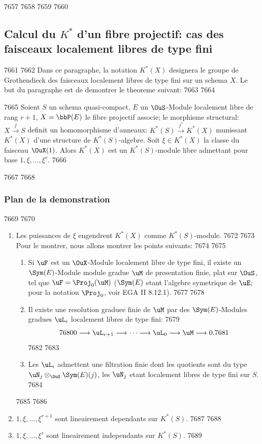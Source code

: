   7657	
  7658	\vspace{1em}
  7659	
  7660	\subsection{Calcul du $K^*$ d'un fibre projectif: cas des faisceaux localement libres de type fini}
  7661	
  7662	Dans ce paragraphe, la notation $K^*(X)$ designera le groupe de Grothendieck des faisceaux localement libres de type fini sur un schema $X$. Le but du paragraphe est de demontrer le theoreme suivant:
  7663	
  7664	\begin{thm}[1.1]\label{thm:1.1}
  7665	Soient $S$ un schema quasi-compact, $E$ un $\OuS$-Module localement libre de rang $r+1$, $X = \bbP(E)$ le fibre projectif associe; le morphisme structural: $X \xrightarrow{f} S$ definit un homomorphisme d'anneaux: $K^*(S) \xrightarrow{f^*} K^*(X)$ munissant $K^*(X)$ d'une structure de $K^*(S)$-algebre. Soit $\xi \in K^*(X)$ la classe du faisceau $\OuX(1)$. Alors $K^*(X)$ est un $K^*(S)$-module libre admettant pour base $1, \xi, \ldots, \xi^r$.
  7666	\end{thm}
  7667	
  7668	\subsubsection{Plan de la demonstration}
  7669	
  7670	\begin{enumerate}[label=$\arabic*^{\circ}$)]
  7671	\item Les puissances de $\xi$ engendrent $K^*(X)$ comme $K^*(S)$-module.
  7672	
  7673	Pour le montrer, nous allons montrer les points suivants:
  7674	
  7675	\begin{enumerate}[label=\alph*)]
  7676	\item Si $\uF$ est un $\OuX$-Module localement libre de type fini, il existe un $\Sym(E)$-Module module gradue $\uM$ de presentation finie, plat sur $\OuS$, tel que $\uF = \Proj_0(\uM)$ ($\Sym(E)$ etant l'algebre symetrique de $\uE$; pour la notation $\Proj_0$, voir EGA II 8.12.1).
  7677	
  7678	\item Il existe une resolution graduee finie de $\uM$ par des $\Sym(E)$-Modules gradues $\uL_i$ localement libres de type fini:
  7679	\[
  7680	0 \longrightarrow \uL_{r+1} \longrightarrow \cdots \longrightarrow \uL_0 \longrightarrow \uM \longrightarrow 0.
  7681	\]
  7682	
  7683	\item Les $\uL_i$ admettent une filtration finie dont les quotients sont du type $\uN_j \otimes_{\OuS} \Sym(E)(j)$, les $\uN_j$ etant localement libres de type fini sur $S$.
  7684	\end{enumerate}
  7685	
  7686	\item $1, \xi, \ldots, \xi^{r+1}$ sont lineairement dependants sur $K^*(S)$.
  7687	
  7688	\item $1, \xi, \ldots, \xi^r$ sont lineairement independants sur $K^*(S)$.
  7689	\end{enumerate}
